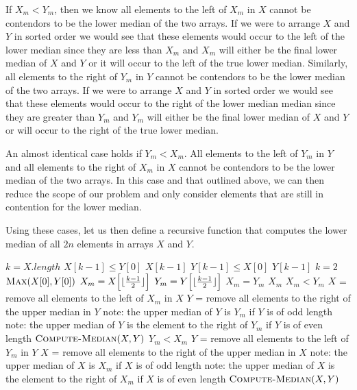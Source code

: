 \documentclass[11pt]{article}
\DeclarePairedDelimiter\floor{\lfloor}{\rfloor}
\begin{document}
If $X_m < Y_m$, then we know all elements to the left of $X_m$ in $X$ cannot be contendors to be the lower median of the two arrays. If we were to arrange $X$ and $Y$ in sorted order we would see that these elements would occur to the left of the lower median since they are less than $X_m$ and $X_m$ will either be the final lower median of $X$ and $Y$ or it will occur to the left of the true lower median. Similarly, all elements to the right of $Y_m$ in $Y$ cannot be contendors to be the lower median of the two arrays. If we were to arrange $X$ and $Y$ in sorted order we would see that these elements would occur to the right of the lower median median since they are greater than $Y_m$ and $Y_m$ will either be the final lower median of $X$ and $Y$ or will occur to the right of the true lower median.

An almost identical case holds if $Y_m < X_m$. All elements to the left of $Y_m$ in $Y$ and all elements to the right of $X_m$ in $X$ cannot be contendors to be the lower median of the two arrays. In this case and that outlined above, we can then reduce the scope of our problem and only consider elements that are still in contention for the lower median.

Using these cases, let us then define a recursive function that computes the lower median of all $2n$ elements in arrays $X$ and $Y$.

\begin{codebox}
\li $k = X.length$
\li \If $X[k-1] \leq Y[0]$ \Then
\li     \Return $X[k-1]$
\li
\li \ElseIf $Y[k-1] \leq X[0]$ \Then
\li     \Return $Y[k-1]$
\li
\li \ElseIf $k = 2$ \Then
\li     \Return $\textnormal{\scshape Max}(X[0],Y[0])$
\li
\li \Else
\li     $X_m = X\Big[\floor{\frac{k-1}{2}}\Big]$
\li     $Y_m = Y\Big[\floor{\frac{k-1}{2}}\Big]$
\li
\li     \If $X_m = Y_m$ \Then
\li         \Return $X_m$
\li
\li     \ElseIf $X_m < Y_m$ \Then
\li         $X$ = remove all elements to the left of $X_m$ in $X$
\li         $Y$ = remove all elements to the right of the upper median in $Y$
\li         \Comment note: the upper median of $Y$ is $Y_m$ if $Y$ is of odd length
\li         \Comment note: the upper median of $Y$ is the element to the right of $Y_m$ if $Y$ is of even length
\li         \Return $\textnormal{\scshape Compute-Median}(X,Y)$
\li
\li     \ElseIf $Y_m < X_m$ \Then
\li         $Y$ = remove all elements to the left of $Y_m$ in $Y$
\li         $X$ = remove all elements to the right of the upper median in $X$
\li         \Comment note: the upper median of $X$ is $X_m$ if $X$ is of odd length
\li         \Comment note: the upper median of $X$ is the element to the right of $X_m$ if $X$ is of even length
\li         \Return $\textnormal{\scshape Compute-Median}(X,Y)$
        \End
    \End
\end{codebox}
\end{document}
